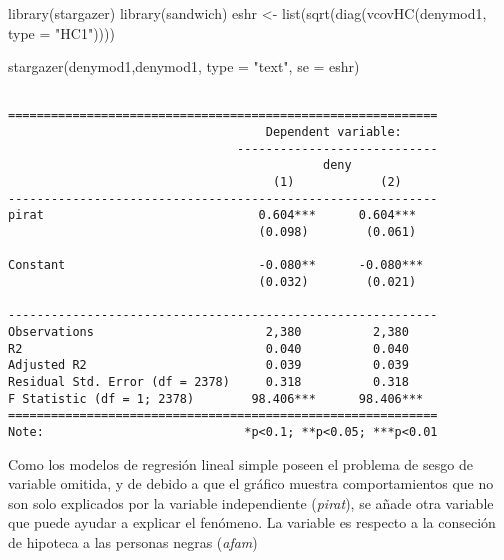 \documentclass[
  letterpaper,
  DIV=11,
  numbers=noendperiod]{scrreprt}
\newenvironment{Shaded}{\begin{snugshade}}{\end{snugshade}}
\newcommand{\AttributeTok}[1]{\textcolor[rgb]{0.40,0.45,0.13}{#1}}
\newcommand{\FunctionTok}[1]{\textcolor[rgb]{0.28,0.35,0.67}{#1}}
\newcommand{\NormalTok}[1]{\textcolor[rgb]{0.00,0.23,0.31}{#1}}
\newcommand{\OtherTok}[1]{\textcolor[rgb]{0.00,0.23,0.31}{#1}}
\newcommand{\StringTok}[1]{\textcolor[rgb]{0.13,0.47,0.30}{#1}}
\begin{document}
\begin{Shaded}
\begin{Highlighting}[]
\FunctionTok{library}\NormalTok{(stargazer)}
\FunctionTok{library}\NormalTok{(sandwich)}
\NormalTok{eshr }\OtherTok{\textless{}{-}} \FunctionTok{list}\NormalTok{(}\FunctionTok{sqrt}\NormalTok{(}\FunctionTok{diag}\NormalTok{(}\FunctionTok{vcovHC}\NormalTok{(denymod1, }
                              \AttributeTok{type =} \StringTok{"HC1"}\NormalTok{))))}

\FunctionTok{stargazer}\NormalTok{(denymod1,denymod1, }
          \AttributeTok{type =} \StringTok{"text"}\NormalTok{, }
          \AttributeTok{se =}\NormalTok{ eshr)}
\end{Highlighting}
\end{Shaded}

\begin{verbatim}

============================================================
                                    Dependent variable:     
                                ----------------------------
                                            deny            
                                     (1)            (2)     
------------------------------------------------------------
pirat                              0.604***      0.604***   
                                   (0.098)        (0.061)   
                                                            
Constant                           -0.080**      -0.080***  
                                   (0.032)        (0.021)   
                                                            
------------------------------------------------------------
Observations                        2,380          2,380    
R2                                  0.040          0.040    
Adjusted R2                         0.039          0.039    
Residual Std. Error (df = 2378)     0.318          0.318    
F Statistic (df = 1; 2378)        98.406***      98.406***  
============================================================
Note:                            *p<0.1; **p<0.05; ***p<0.01
\end{verbatim}

Como los modelos de regresión lineal simple poseen el problema de sesgo
de variable omitida, y de debido a que el gráfico muestra
comportamientos que no son solo explicados por la variable independiente
(\emph{pirat}), se añade otra variable que puede ayudar a explicar el
fenómeno. La variable es respecto a la conseción de hipoteca a las
personas negras (\emph{afam})
\end{document}
